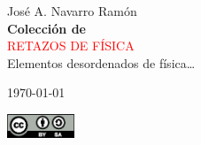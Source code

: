 %

\newcommand*{\titleTH}{\begingroup%
\raggedleft
\vspace*{\baselineskip}
{\Large José A. Navarro Ramón}\\[0.167\textheight]
{\bfseries Colección de}\\[\baselineskip]
{\textcolor{red}{\Huge RETAZOS DE FÍSICA}}\\[\baselineskip]
{\small Elementos desordenados de física\dots}\par
\vspace{2ex}
\today\par
\vspace{20ex}
{\Large \includegraphics[width=2.0cm]{./img/by-sa.eps}}\par
\vspace*{3\baselineskip}
\endgroup}

\titleTH


